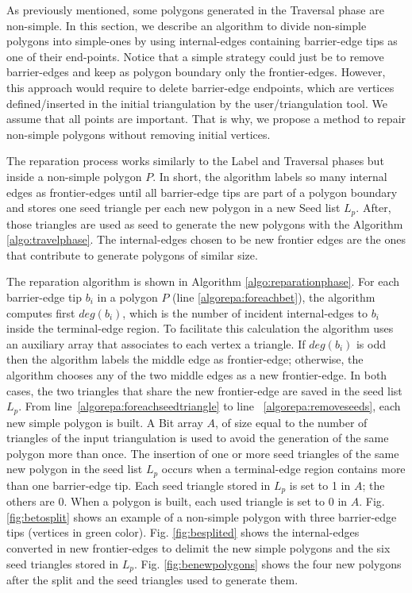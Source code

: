 \documentclass[lineno,pdflatex,sn-mathphys]{sn-jnl}%
\theoremstyle{thmstyleone}%
\theoremstyle{thmstyletwo}%
\theoremstyle{thmstylethree}%
\begin{document}
As previously mentioned, some polygons generated in the Traversal phase are non-simple. In this section, we describe an algorithm to divide non-simple polygons into simple-ones by using internal-edges containing barrier-edge tips as one of their end-points. 
Notice that a simple strategy could just be to remove barrier-edges and keep as polygon boundary only the frontier-edges. However, this approach would require to delete barrier-edge endpoints, which are vertices defined/inserted in  the initial triangulation by the user/triangulation tool. We assume that all points are important. That is why, we propose  a method to repair non-simple  polygons without removing initial vertices.

The reparation process works similarly to the Label and Traversal phases but inside a non-simple polygon $P$. In short, the algorithm labels so many internal edges as frontier-edges until all barrier-edge tips are part of a polygon boundary and stores one seed triangle per each new polygon in a new Seed list $L_p$. After, those triangles are used as seed to generate the new polygons with the Algorithm \ref{algo:travelphase}. The internal-edges chosen to be new frontier edges are the ones that contribute to generate polygons of similar size.

The reparation algorithm is shown in Algorithm \ref{algo:reparationphase}. For each barrier-edge tip $b_i$ in a polygon $P$ (line \ref{algorepa:foreachbet}), the algorithm computes first $deg(b_i)$, which is the number of incident internal-edges to $b_i$ inside the terminal-edge region. To facilitate this calculation the algorithm uses an auxiliary array that associates to each vertex a triangle. If $deg(b_i)$ is odd then the algorithm labels the middle edge as frontier-edge; otherwise, the algorithm chooses any of the two middle edges as a new frontier-edge. In both cases, the two triangles that share the new frontier-edge are saved in the seed list $L_p$. From line~\ref{algorepa:foreachseedtriangle} to line ~\ref{algorepa:removeseeds}, each new simple polygon is built. A Bit array $A$, of size equal to the number of triangles of the input triangulation is used to avoid the generation of the same polygon more than once. The insertion of one or more seed triangles of the same new polygon in the seed list $L_p$ occurs when a terminal-edge region contains more than one barrier-edge tip. Each seed triangle stored in $L_p$ is set to 1 in $A$; the others are 0. When a polygon is built, each used triangle is set to $0$ in $A$. Fig. \ref{fig:betosplit} shows an example of a non-simple polygon with three barrier-edge tips (vertices in green color). Fig. \ref{fig:besplited} shows the internal-edges converted in new frontier-edges to delimit the new simple polygons and the six seed triangles stored in $L_p$.  Fig. \ref{fig:benewpolygons} shows the four new polygons after the split and the seed triangles used to generate them.
\end{document}
